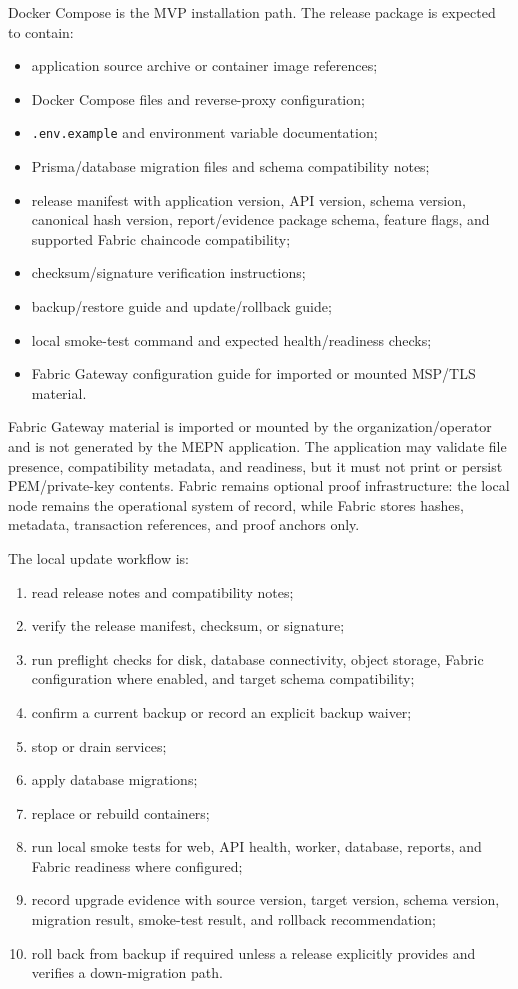\documentclass[11pt,a4paper]{article}
\begin{document}
Docker Compose is the MVP installation path. The release package is expected to contain:
\begin{itemize}
\item application source archive or container image references;
\item Docker Compose files and reverse-proxy configuration;
\item \texttt{.env.example} and environment variable documentation;
\item Prisma/database migration files and schema compatibility notes;
\item release manifest with application version, API version, schema version, canonical hash version, report/evidence package schema, feature flags, and supported Fabric chaincode compatibility;
\item checksum/signature verification instructions;
\item backup/restore guide and update/rollback guide;
\item local smoke-test command and expected health/readiness checks;
\item Fabric Gateway configuration guide for imported or mounted MSP/TLS material.
\end{itemize}

Fabric Gateway material is imported or mounted by the organization/operator and is not generated by the MEPN application. The application may validate file presence, compatibility metadata, and readiness, but it must not print or persist PEM/private-key contents. Fabric remains optional proof infrastructure: the local node remains the operational system of record, while Fabric stores hashes, metadata, transaction references, and proof anchors only.

The local update workflow is:
\begin{enumerate}
\item read release notes and compatibility notes;
\item verify the release manifest, checksum, or signature;
\item run preflight checks for disk, database connectivity, object storage, Fabric configuration where enabled, and target schema compatibility;
\item confirm a current backup or record an explicit backup waiver;
\item stop or drain services;
\item apply database migrations;
\item replace or rebuild containers;
\item run local smoke tests for web, API health, worker, database, reports, and Fabric readiness where configured;
\item record upgrade evidence with source version, target version, schema version, migration result, smoke-test result, and rollback recommendation;
\item roll back from backup if required unless a release explicitly provides and verifies a down-migration path.
\end{enumerate}
\end{document}
